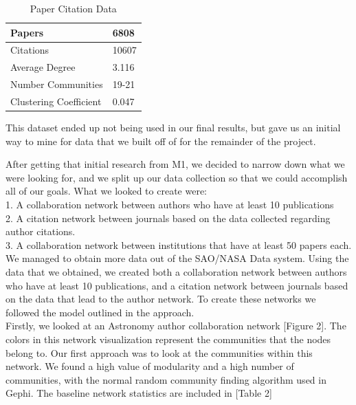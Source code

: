 \documentclass[times, 10pt,twocolumn]{article}
\begin{document}
\begin{table}[h]
\centering
\caption{Paper Citation Data}
\begin{tabular}{|l|l|}
\hline
Papers                 & 6808  \\ \hline
Citations              & 10607 \\ \hline
Average Degree         & 3.116 \\ \hline
Number Communities     & 19-21 \\ \hline
Clustering Coefficient & 0.047 \\ \hline
\end{tabular}
\end{table}

This dataset ended up not being used in our final results, but gave us an initial way to mine for data that we built off of for the remainder of the project.

After getting that initial research from M1, we decided to narrow down what we were looking for, and we split up our data collection so that we could accomplish all of our goals. What we looked to create were: \\
1. A collaboration network between authors who have at least 10 publications \\
2. A citation network between journals based on the data collected regarding author citations.\\
3. A collaboration network between institutions that have at least 50 papers each.\\

We managed to obtain more data out of the SAO/NASA Data system. Using the data that we obtained, we created both a collaboration network between authors who have at least 10 publications, and a citation network between journals based on the data that lead to the author network. To create these networks we followed the model outlined in the approach.  \\

Firstly, we looked at an Astronomy author collaboration network [Figure 2]. The colors in this network visualization represent the communities that the nodes belong to. Our first approach was to look at the communities within this network. We found a high value of modularity and a high number of communities, with the normal random community finding algorithm used in Gephi. The baseline network statistics are included in [Table 2] \\
\end{document}
